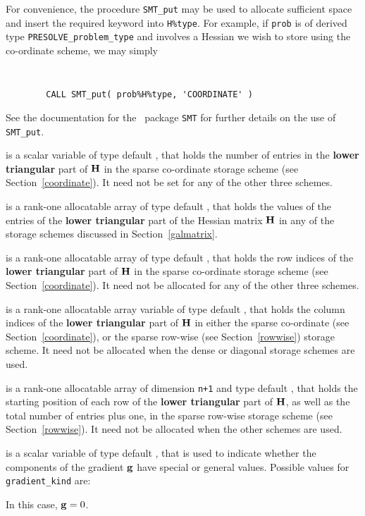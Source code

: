 \documentclass{galahad}
\newcommand{\packagename}{PRESOLVE}
\begin{document}
\begin{description}
\begin{description}
For convenience, the procedure {\tt SMT\_put} 
may be used to allocate sufficient space and insert the required keyword
into {\tt H\%type}.
For example, if {\tt prob} is of derived type {\tt \packagename\_problem\_type}
and involves a Hessian we wish to store using the co-ordinate scheme,
we may simply
{\tt 
\begin{verbatim}
        CALL SMT_put( prob%H%type, 'COORDINATE' )
\end{verbatim}
}
\noindent
See the documentation for the \galahad\ package {\tt SMT} 
for further details on the use of {\tt SMT\_put}.

 is a scalar variable of type default \integer, that 
holds the number of entries in the {\bf lower triangular} part of ${\mathbf{H}}$
in the sparse co-ordinate storage scheme (see Section~\ref{coordinate}). 
It need not be set for any of the other three schemes.

 is a rank-one allocatable array of type default \realdp, that holds
the values of the entries of the {\bf lower triangular} part
of the Hessian matrix ${\mathbf{H}}$ in any of the 
storage schemes discussed in Section~\ref{galmatrix}.

 is a rank-one allocatable array of type default \integer,
that holds the row indices of the {\bf lower triangular} part of ${\mathbf{H}}$ 
in the sparse co-ordinate storage
scheme (see Section~\ref{coordinate}). 
It need not be allocated for any of the other three schemes.

 is a rank-one allocatable array variable of type default \integer,
that holds the column indices of the {\bf lower triangular} part of 
${\mathbf{H}}$ in either the sparse co-ordinate 
(see Section~\ref{coordinate}), or the sparse row-wise 
(see Section~\ref{rowwise}) storage scheme.
It need not be allocated when the dense or diagonal storage schemes are used.

 is a rank-one allocatable array of dimension {\tt n+1} and type 
default \integer, that holds the starting position of 
each row of the {\bf lower triangular} part of ${\mathbf{H}}$, as well
as the total number of entries plus one, in the sparse row-wise storage
scheme (see Section~\ref{rowwise}). It need not be allocated when the
other schemes are used.

\end{description}

 is a scalar variable of type default \integer, 
that is used to indicate whether the components of the gradient ${\mathbf{g}}$ 
have special or general values. Possible values for {\tt gradient\_kind} are:
\begin{description}
  In this case, ${\mathbf{g}} = 0$.


\end{description}
\end{description}
\end{document}
